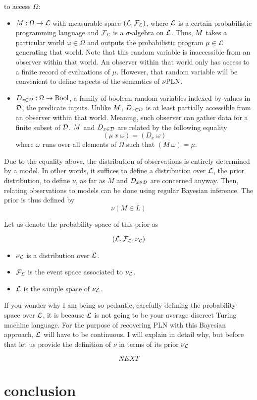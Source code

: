 \documentclass[]{article}
\begin{document}
to access $\Omega$:
\begin{itemize}
\item $M : \Omega \to \mathcal{L}$ with measurable space
  $(\mathcal{L}, \mathcal{F}_{\mathcal{L}})$, where $\mathcal{L}$ is a certain
  probabilistic programming language and $\mathcal{F}_{\mathcal{L}}$ is a
  $\sigma$-algebra on $\mathcal{L}$.  Thus, $M$ takes a particular
  world $\omega \in \Omega$ and outputs the probabilistic program $\mu
  \in \mathcal{L}$ generating that world.  Note that this random
  variable is inaccessible from an observer within that world.  An
  observer within that world only has access to a finite record of
  evaluations of $\mu$.  However, that random variable will be
  convenient to define aspects of the semantics of $\nu\textup{PLN}$.
\item $D_{x\in\mathcal{D}} : \Omega \to \textup{Bool}$, a family of boolean random variables
  indexed by values in $\mathcal{D}$, the predicate inputs.  Unlike
  $M$, $D_{x\in\mathcal{D}}$ is at least partially accessible from an observer
  within that world.  Meaning, such observer can gather data for a
  finite subset of $\mathcal{D}$.  $M$ and $D_{x\in\mathcal{D}}$ are related by the
  following equality
  $$(\mu\ x\ \omega) = (D_x\ \omega)$$ where $\omega$ runs over all
  elements of $\Omega$ such that $(M\ \omega) = \mu$.
\end{itemize}
Due to the equality above, the distribution of observations is
entirely determined by a model.  In other words, it suffices to define
a distribution over $\mathcal{L}$, the prior distribution, to define
$\nu$, as far as $M$ and $D_{x\in\mathcal{D}}$ are concerned anyway.  Then, relating
observations to models can be done using regular Bayesian inference.
The prior is thus defined by
$$\nu(M \in L)$$


Let us denote the probability space
of this prior as

$$(\mathcal{L}, \mathcal{F}_{\mathcal{L}}, \nu_{\mathcal{L}})$$

\begin{itemize}
\item $\nu_{\mathcal{L}}$ is a distribution over $\mathcal{L}$.
\item $\mathcal{F}_{\mathcal{L}}$ is the event space associated to
  $\nu_{\mathcal{L}}$.
\item $\mathcal{L}$ is the sample space of $\nu_{\mathcal{L}}$.
\end{itemize}
If you wonder why I am being so pedantic, carefully defining the
probability space over $\mathcal{L}$, it is because $\mathcal{L}$ is not
going to be your average discreet Turing machine language.  For the
purpose of recovering PLN with this Bayesian approach, $\mathcal{L}$
will have to be continuous.  I will explain in detail why, but before
that let us provide the definition of $\nu$ in terms of its prior
$\nu_{\mathcal{L}}$

$$NEXT$$

\section{conclusion}



\end{document}
